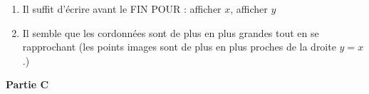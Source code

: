 \documentclass[10pt]{article}
\begin{document}
\begin{enumerate}
\item %
 
% 
%
Il suffit d'écrire avant le FIN POUR : afficher $x$, afficher $y$
\item %

% 
Il semble que les cordonnées sont de plus en plus grandes tout en se rapprochant (les points images sont de plus en plus proches de la droite $y = x$.) 
\end{enumerate}

\bigskip
 
\textbf{Partie C}

\medskip
\end{document}

